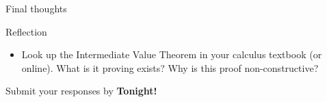 \documentclass{beamer}
\begin{document}
\begin{frame}{Final thoughts}
  \begin{block}{Reflection}
    \begin{itemize}
      \item Look up the Intermediate Value Theorem in your calculus textbook (or online).  What is it proving exists?  Why is this proof non-constructive?
    \end{itemize}
  \end{block}
\begin{center}
Submit your responses by \textbf{Tonight!}
\end{center}
\end{frame}
\end{document}
